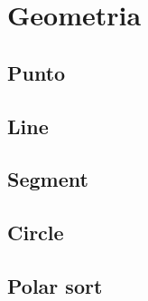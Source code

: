 \newpage
\section{Geometria}

\subsection{Punto}


\subsection{Line}


\subsection{Segment}


\subsection{Circle}


\subsection{Polar sort}


\newpage
